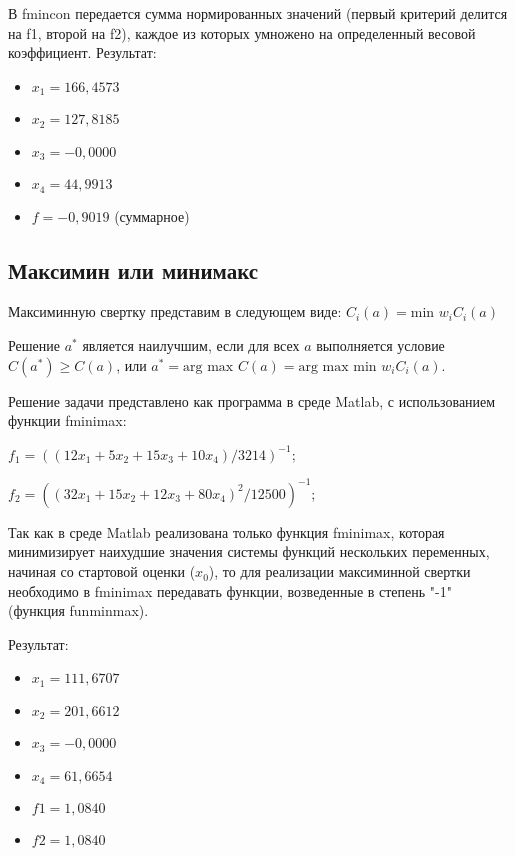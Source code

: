 В fmincon передается сумма нормированных значений (первый критерий делится на f1, второй на f2), каждое из которых умножено на определенный весовой коэффициент. Результат:
\begin{itemize}
\item $x_1 = 166,4573$
\item $x_2 = 127,8185$
\item $x_3 = -0,0000$
\item $x_4 = 44,9913$
\item $f = -0,9019$ (суммарное)
\end{itemize}

\subsection{Максимин или минимакс}

Максиминную свертку представим в следующем виде: $C_i(a)= \text{min } w_i C_i(a)$

Решение $a^*$ является наилучшим, если для всех $a$ выполняется условие $C(a^*) \geq C(a)$, или $a^* = \text{arg max } C(a) = \text{arg max min } w_i C_i (a)$.

Решение задачи представлено как программа в среде Matlab, с использованием функции fminimax:

$f_1=((12x_1+5x_2+15x_3+10x_4)/3214)^{-1}$;

$f_2=((32x_1+15x_2+12x_3+80x_4 )^2/12500)^{-1}$;



\newpage


Так как в среде Matlab реализована только функция fminimax, которая минимизирует наихудшие значения системы функций нескольких переменных, начиная со стартовой оценки ($x_0$), то для реализации максиминной свертки необходимо в fminimax передавать функции, возведенные в степень "-1" (функция funminmax).

Результат:
\begin{itemize}
\item $x_1 = 111,6707$
\item $x_2 = 201,6612$
\item $x_3 = -0,0000$
\item $x_4 = 61,6654$
\item $f1 = 1,0840$
\item $f2 = 1,0840$
\end{itemize}

